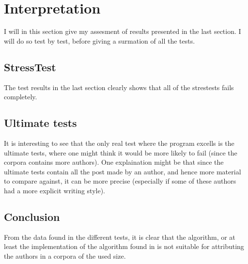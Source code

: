 \section{Interpretation}
I will in this section give my assesment of results presented in the last section. I will do so test by test, before giving a surmation of all the tests.

\subsection{StressTest} 
The test results in the last section clearly shows that all of the strestests fails completely.


\subsection{Ultimate tests}
It is interesting to see that the only real test where the program excells is the ultimate tests, where one might think it would be more likely to fail (since the corpora contains more authors). One explaination might be that since the ultimate tests contain all the post made by an author, and hence more material to compare against, it can be more precise (especially if some of these authors had a more explicit writing style).

\subsection{Conclusion}
From the data found in the different tests, it is clear that the algorithm, or at least the implementation of the algorithm found in \cite{nr4} is not suitable for attributing the authors in a corpora of the used size.
